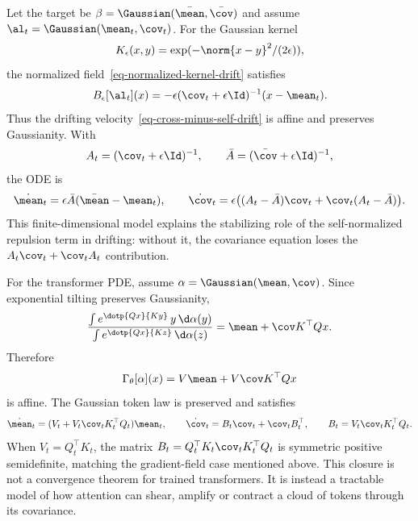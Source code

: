 \begin{example}
	Let the target be $\beta=\Gaussian(\bar\mean,\bar\cov)$ and assume $\al_t=\Gaussian(\mean_t,\cov_t)$. For the Gaussian kernel
	\[
		K_\epsilon(x,y)=\exp(-\norm{x-y}^2/(2\epsilon)),
	\]
	the normalized field~\eqref{eq-normalized-kernel-drift} satisfies
	\[
		B_\epsilon[\al_t](x)
		=
		-\epsilon(\cov_t+\epsilon\Id)^{-1}(x-\mean_t).
	\]
	Thus the drifting velocity~\eqref{eq-cross-minus-self-drift} is affine and preserves Gaussianity. With
	\[
		A_t=(\cov_t+\epsilon\Id)^{-1},
		\qquad
		\bar A=(\bar\cov+\epsilon\Id)^{-1},
	\]
	the ODE is
	\[
		\dot\mean_t=\epsilon\bar A(\bar\mean-\mean_t),
		\qquad
		\dot\cov_t=\epsilon\bigl((A_t-\bar A)\cov_t+\cov_t(A_t-\bar A)\bigr).
	\]
	This finite-dimensional model explains the stabilizing role of the self-normalized repulsion term in drifting: without it, the covariance equation loses the $A_t\cov_t+\cov_tA_t$ contribution.
\end{example}

\begin{example}
	For the transformer PDE, assume $\alpha=\Gaussian(\mean,\cov)$. Since exponential tilting preserves Gaussianity,
	\[
		\frac{\int e^{\dotp{Qx}{Ky}}\,y\,\d\alpha(y)}
		     {\int e^{\dotp{Qx}{Kz}}\,\d\alpha(z)}
		=
		\mean+\cov K^\top Qx.
	\]
	Therefore
	\[
		\Gamma_\theta[\alpha](x)=V\mean+V\cov K^\top Qx
	\]
	is affine. The Gaussian token law is preserved and satisfies
	\[
		\dot\mean_t=(V_t+V_t\cov_tK_t^\top Q_t)\mean_t,
		\qquad
		\dot\cov_t=B_t\cov_t+\cov_tB_t^\top,
		\qquad
		B_t=V_t\cov_tK_t^\top Q_t.
	\]
	When $V_t=Q_t^\top K_t$, the matrix $B_t=Q_t^\top K_t\cov_tK_t^\top Q_t$ is symmetric positive semidefinite, matching the gradient-field case mentioned above.
	This closure is not a convergence theorem for trained transformers. It is instead a tractable model of how attention can shear, amplify or contract a cloud of tokens through its covariance.
\end{example}
